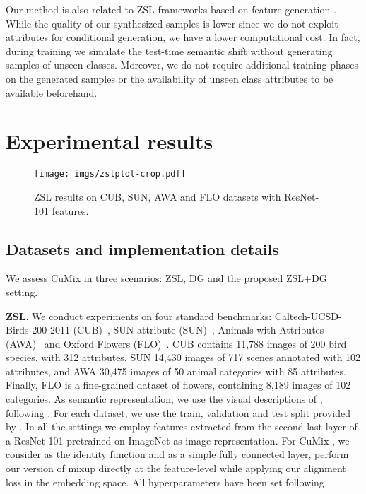 \documentclass[runningheads]{llncs}
\newcommand{\myparagraph}[1]{\noindent\textbf{#1}}
\newcommand{\methodName}{{CuMix} }
\begin{document}
Our method is also related to ZSL frameworks based on feature generation \cite{xian2018feature,xian2019fvaegan}. While the quality of our synthesized samples is lower since we do not exploit attributes for conditional generation, we have a lower computational cost. {In fact, during training we simulate the test-time semantic shift without generating samples of unseen classes. Moreover, we do not require additional training phases on the generated samples or the availability of unseen class attributes to be available beforehand.}

 
\section{Experimental results}
\begin{figure}[tb]
  \centering
  \texttt{[image: imgs/zslplot-crop.pdf]} 
   \caption{ZSL results on CUB, SUN, AWA and FLO datasets with ResNet-101 features.}
  \label{fig:zsl-results}
 \end{figure}

\subsection{Datasets and implementation details}
We assess \methodName in three scenarios: ZSL, DG and the proposed ZSL+DG setting. 

\myparagraph{ZSL}. We conduct experiments on {four} standard benchmarks: Caltech-UCSD-Birds 200-2011 (CUB)~\cite{welinder2010cub}, SUN attribute (SUN)~\cite{patterson2012sun}, Animals with Attributes (AWA)~\cite{lampert2013awa} and Oxford Flowers (FLO)~\cite{nilsback2008flo}. CUB contains 11,788 images of 200 bird species, with 312 attributes, SUN 14,430 images of 717 scenes annotated with 102 attributes, and AWA 30,475 images of 50 animal categories with 85 attributes. Finally, FLO is a fine-grained dataset of flowers, containing 8,189 images of 102 categories. As semantic representation, we use the visual descriptions of \cite{reed2016learning}, following 
\cite{xian2018feature,xian2019semantic}. For each dataset, we use the train, validation and test split provided by \cite{xian2018zeroshotgood}. In all the settings we employ features extracted from the second-last layer of a ResNet-101 \cite{he2016deep} pretrained on ImageNet as image representation. For \methodName, we consider  as the identity function and as  a simple fully connected layer, perform our version of mixup directly at the feature-level while applying our alignment loss in the embedding space. All hyperparameters have been set following \cite{xian2018zeroshotgood}.
\end{document}
